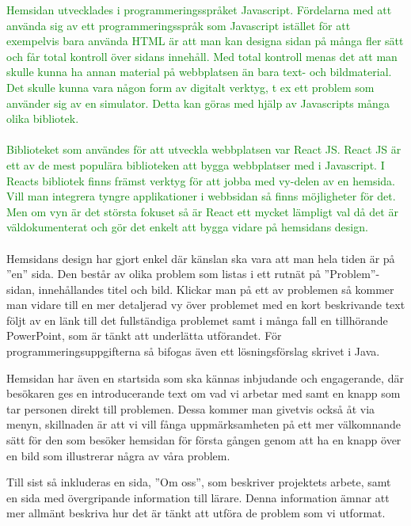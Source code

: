 \textcolor{green}{Hemsidan utvecklades i programmeringsspråket Javascript. Fördelarna med att använda sig av ett programmeringsspråk som Javascript istället för att exempelvis bara använda HTML är att man kan designa sidan på många fler sätt och får total kontroll över sidans innehåll. Med total kontroll menas det att man skulle kunna ha annan material på webbplatsen än bara text- och bildmaterial. Det skulle kunna vara någon form av digitalt verktyg, t ex ett problem som använder sig av en simulator. Detta kan göras med hjälp av Javascripts många olika bibliotek.}
\\ \\
\textcolor{green}{Biblioteket som användes för att utveckla webbplatsen var React JS. React JS är ett av de mest populära biblioteken att bygga webbplatser med i Javascript. I Reacts bibliotek finns främst verktyg för att jobba med vy-delen av en hemsida. Vill man integrera tyngre applikationer i webbsidan så finns möjligheter för det. Men om vyn är det största fokuset så är React ett mycket lämpligt val då det är väldokumenterat och gör det enkelt att bygga vidare på hemsidans design.}
\\ \\
\textcolor{Mahogany}{Hemsidans design har gjort enkel där känslan ska vara att man hela tiden är på ''en'' sida. Den består av olika problem som listas i ett rutnät på ''Problem''-sidan, innehållandes titel och bild. Klickar man på ett av problemen så kommer man vidare till en mer detaljerad vy över problemet med en kort beskrivande text följt av en länk till det fullständiga problemet samt i många fall en tillhörande PowerPoint, som är tänkt att underlätta utförandet. För programmeringsuppgifterna så bifogas även ett lösningsförslag skrivet i Java.}

\textcolor{Mahogany}{Hemsidan har även en startsida som ska kännas inbjudande och engagerande, där besökaren ges en introducerande text om vad vi arbetar med samt en knapp som tar personen direkt till problemen. Dessa kommer man givetvis också åt via menyn, skillnaden är att vi vill fånga uppmärksamheten på ett mer välkomnande sätt för den som besöker hemsidan för första gången genom att ha en knapp över en bild som illustrerar några av våra problem.}

\textcolor{Mahogany}{Till sist så inkluderas en sida, ''Om oss'', som beskriver projektets arbete, samt en sida med övergripande information till lärare. Denna information ämnar att mer allmänt beskriva hur det är tänkt att utföra de problem som vi utformat. }